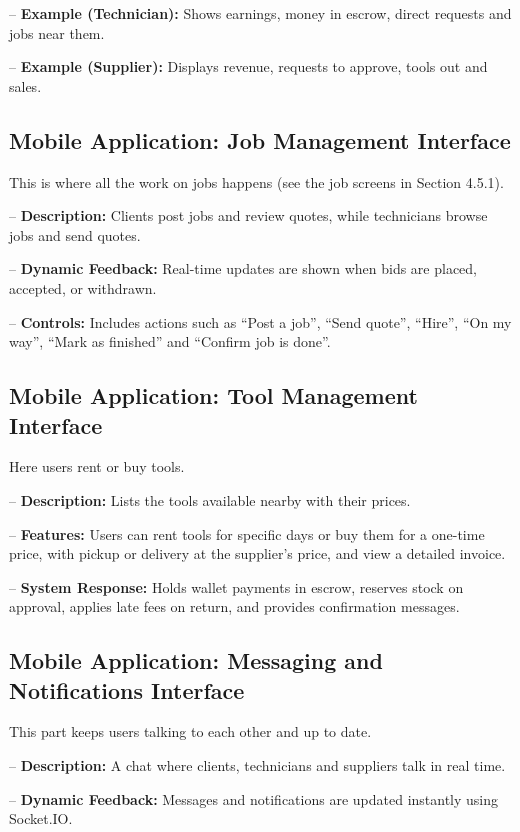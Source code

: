 \documentclass[A4paper,12pt]{report}
\theoremstyle{plain}
\theoremstyle{definition}
\theoremstyle{remark}
\numberwithin{equation}{section}
\begin{document}
-- \textbf{Example (Technician):} Shows earnings, money in escrow, direct requests and jobs near them.

-- \textbf{Example (Supplier):} Displays revenue, requests to approve, tools out and sales.

\subsection{Mobile Application: Job Management Interface}

This is where all the work on jobs happens (see the job screens in Section 4.5.1).

-- \textbf{Description:} Clients post jobs and review quotes, while technicians browse jobs and send quotes.

-- \textbf{Dynamic Feedback:} Real-time updates are shown when bids are placed, accepted, or withdrawn.

-- \textbf{Controls:} Includes actions such as ``Post a job'', ``Send quote'', ``Hire'', ``On my way'', ``Mark as finished'' and ``Confirm job is done''.

\subsection{Mobile Application: Tool Management Interface}

Here users rent or buy tools.

-- \textbf{Description:} Lists the tools available nearby with their prices.

-- \textbf{Features:} Users can rent tools for specific days or buy them for a one-time price, with pickup or delivery at the supplier's price, and view a detailed invoice.

-- \textbf{System Response:} Holds wallet payments in escrow, reserves stock on approval, applies late fees on return, and provides confirmation messages.

\subsection{Mobile Application: Messaging and Notifications Interface}

This part keeps users talking to each other and up to date.

-- \textbf{Description:} A chat where clients, technicians and suppliers talk in real time.

-- \textbf{Dynamic Feedback:} Messages and notifications are updated instantly using Socket.IO.
\end{document}
